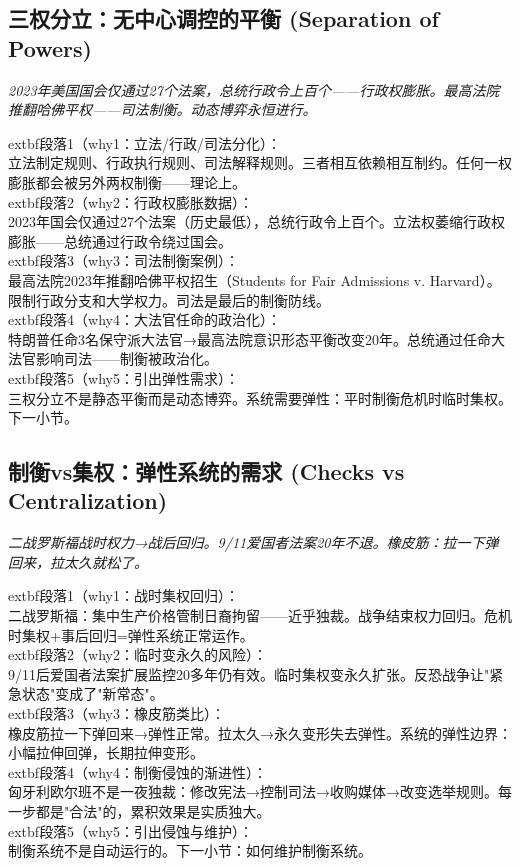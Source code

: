 \documentclass[a4paper,12pt]{book}
\newenvironment{motivation}{\begin{tcolorbox}[colback=gray!10,colframe=gray!60,title=\textit{本章动机},fonttitle=\bfseries,arc=0mm,leftrule=3mm]\small\itshape}{\end{tcolorbox}}
\begin{document}
\begin{motivation}
\begin{motivation}
\begin{motivation}
	\subsection{三权分立：无中心调控的平衡 (Separation of Powers)}
	\begin{motivation}2023年美国国会仅通过27个法案，总统行政令上百个——行政权膨胀。最高法院推翻哈佛平权——司法制衡。动态博弈永恒进行。\end{motivation}
		extbf{段落1（why1：立法/行政/司法分化）}：\\立法制定规则、行政执行规则、司法解释规则。三者相互依赖相互制约。任何一权膨胀都会被另外两权制衡——理论上。\\	extbf{段落2（why2：行政权膨胀数据）}：\\2023年国会仅通过27个法案（历史最低），总统行政令上百个。立法权萎缩行政权膨胀——总统通过行政令绕过国会。\\	extbf{段落3（why3：司法制衡案例）}：\\最高法院2023年推翻哈佛平权招生（Students for Fair Admissions v. Harvard）。限制行政分支和大学权力。司法是最后的制衡防线。\\	extbf{段落4（why4：大法官任命的政治化）}：\\特朗普任命3名保守派大法官→最高法院意识形态平衡改变20年。总统通过任命大法官影响司法——制衡被政治化。\\	extbf{段落5（why5：引出弹性需求）}：\\三权分立不是静态平衡而是动态博弈。系统需要弹性：平时制衡危机时临时集权。下一小节。

	\subsection{制衡vs集权：弹性系统的需求 (Checks vs Centralization)}
	\begin{motivation}二战罗斯福战时权力→战后回归。9/11爱国者法案20年不退。橡皮筋：拉一下弹回来，拉太久就松了。\end{motivation}
		extbf{段落1（why1：战时集权回归）}：\\二战罗斯福：集中生产价格管制日裔拘留——近乎独裁。战争结束权力回归。危机时集权+事后回归=弹性系统正常运作。\\	extbf{段落2（why2：临时变永久的风险）}：\\9/11后爱国者法案扩展监控20多年仍有效。临时集权变永久扩张。反恐战争让"紧急状态"变成了"新常态"。\\	extbf{段落3（why3：橡皮筋类比）}：\\橡皮筋拉一下弹回来→弹性正常。拉太久→永久变形失去弹性。系统的弹性边界：小幅拉伸回弹，长期拉伸变形。\\	extbf{段落4（why4：制衡侵蚀的渐进性）}：\\匈牙利欧尔班不是一夜独裁：修改宪法→控制司法→收购媒体→改变选举规则。每一步都是"合法"的，累积效果是实质独大。\\	extbf{段落5（why5：引出侵蚀与维护）}：\\制衡系统不是自动运行的。下一小节：如何维护制衡系统。


\end{motivation}
\end{motivation}
\end{motivation}
\end{document}
